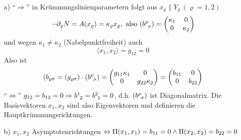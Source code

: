 \begin{beweis} \(\)
 \begin{enumerate}
  \item[a)] ``\(\Rightarrow\)'' in Krümmungslinienparametern folgt aus \(x_\varrho \parallel Y_\varrho \, (\varrho = 1,2)\)
  \[
   - \partial_\varrho N = A(x_\varrho) = \kappa_\varrho x_\varrho, \text{ also } (b^{\mu}_{\;\, \sigma}) = \begin{pmatrix}
                                                                                                       \kappa_1 & 0 \\
                                                                                                       0 & \kappa_2
                                                                                                      \end{pmatrix}
  \]
  und wegen \(\kappa_1 \ne \kappa_2\) (Nabelpunktfreiheit) auch
  \[
   \langle x_1, x_2 \rangle = g_{12} = 0
  \]
  Also ist 
  \[
   (b_{\varrho \sigma} = (g_{\varrho \sigma}) \cdot (b^{\mu}_{\;\, \sigma}) = \begin{pmatrix}
                                                                          g_{11} \kappa_1 & 0 \\
                                                                          0 & g_{22} \kappa_2
                                                                         \end{pmatrix}
                                                                         = \begin{pmatrix}
                                                                            b_{11} & 0 \\
                                                                            0 & b_{22}
                                                                           \end{pmatrix}
  \]
  ``\(\Leftrightarrow\)'' \(g_{12} = b_{12} = 0 \Rightarrow b^{1}_{\;\, 2} = b^{2}_{\;\, 1} = 0\), d.h. \((b^{\mu}_{\;\, \sigma})\) ist Diagonalmatrix. Die Basisvektoren \(x_1, x_2\) sind also Eigenvektoren und definieren die Hauptkrümmungsrichtungen.
  \item[b)]
  \(x_1, x_2\) Asymptotenrichtungen \(\Leftrightarrow \Rom2 (x_1, x_1) = b_{11} = 0 \land \Rom2 (x_2, x_2) = b_{22} = 0\)
 \end{enumerate}

\end{beweis}

